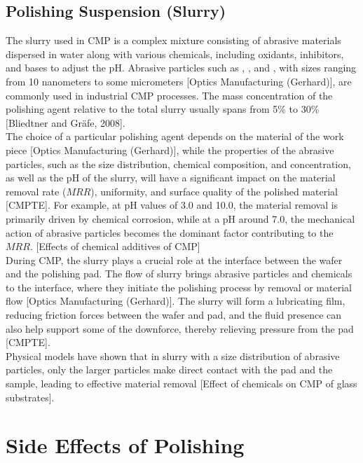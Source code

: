 \subsection{Polishing Suspension (Slurry)}
\label{subsec:polishing_slurry}

The slurry used in CMP is a complex mixture consisting of abrasive materials dispersed in water along with various chemicals, including oxidants, inhibitors, and bases to adjust the pH. Abrasive particles such as , , and , with sizes ranging from 10 nanometers to some micrometers [Optics Manufacturing (Gerhard)], are commonly used in industrial CMP processes. The mass concentration of the polishing agent relative to the total slurry usually spans from 5\% to 30\% [Bliedtner and Gräfe, 2008].
\\
The choice of a particular polishing agent depends on the material of the work piece [Optics Manufacturing (Gerhard)], while the properties of the abrasive particles, such as the size distribution, chemical composition, and concentration, as well as the pH of the slurry, will have a significant impact on the material removal rate ($MRR$), uniformity, and surface quality of the polished material [CMPTE]. For example, at pH values of 3.0 and 10.0, the material removal is primarily driven by chemical corrosion, while at a pH around 7.0, the mechanical action of abrasive particles becomes the dominant factor contributing to the $MRR$. [Effects of chemical additives of CMP]
\\
During CMP, the slurry plays a crucial role at the interface between the wafer and the polishing pad. The flow of slurry brings abrasive particles and chemicals to the interface, where they initiate the polishing process by removal or material flow [Optics Manufacturing (Gerhard)]. The slurry will form a lubricating film, reducing friction forces between the wafer and pad, and the fluid presence can also help support some of the downforce, thereby relieving pressure from the pad [CMPTE].
\\
Physical models have shown that in slurry with a size distribution of abrasive particles, only the larger particles make direct contact with the pad and the sample, leading to effective material removal [Effect of chemicals on CMP of glass substrates]. 

\section{Side Effects of Polishing}
\label{sec:polishing_side_eff}

